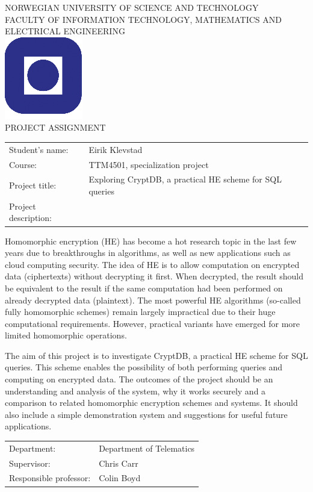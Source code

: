 \documentclass[a4paper,11pt]{article}
\begin{document}
\sffamily
\begin{titlepage}
\begin{center}
\textsc{NORWEGIAN UNIVERSITY OF SCIENCE AND TECHNOLOGY\\
FACULTY OF  INFORMATION TECHNOLOGY, MATHEMATICS AND ELECTRICAL ENGINEERING} \\
\vspace{0.5cm} 
\includegraphics[scale=0.5]{NTNU-logo} \\
\vspace{1.0cm}
{\Huge{PROJECT ASSIGNMENT}}
\vspace{1.0cm}
\end{center}

\begin{tabular}{@{}p{5cm}l}
Student's name:		& Eirik Klevstad\\
Course: 		& TTM4501, specialization project \\
Project title: 		& Exploring CryptDB, a practical HE scheme for SQL queries \\
Project description: 	& \\
\end{tabular}

Homomorphic encryption (HE) has become a hot research topic in the last few years due to breakthroughs in algorithms, as well as new applications such as cloud computing security. The idea of HE is to allow computation on encrypted data (ciphertexts) without decrypting it first. When decrypted, the result should be equivalent to the result if the same computation had been performed on already decrypted data (plaintext). The most powerful HE algorithms (so-called fully homomorphic schemes) remain largely impractical due to their huge computational requirements. However, practical variants have emerged for more limited homomorphic operations.

The aim of this project is to investigate CryptDB, a practical HE scheme for SQL queries. This scheme enables the possibility of both performing queries and computing on encrypted data. The outcomes of the project should be an understanding and analysis of the system, why it works securely and a comparison to related homomorphic encryption schemes and systems. It should also include a simple demonstration system and suggestions for useful future applications.

\begin{tabular}{@{}p{5cm}l}
Department:		& Department of Telematics \\
Supervisor:		& Chris Carr \\
Responsible professor: 	& Colin Boyd \\
\end{tabular}

\end{titlepage}
\end{document}
